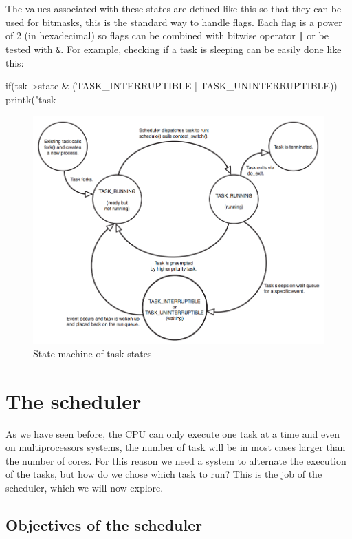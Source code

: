 \documentclass[10pt]{book}
\begin{document}
The values associated with these states are defined like this so that they can be used for bitmasks, this is the standard way to handle flags. Each flag is a power of 2 (in hexadecimal) so flags can be combined with bitwise operator \verb&|& or be tested with \verb|&|. For example, checking if a task is sleeping can be easily done like this: 
\begin{code}
if(tsk->state & (TASK_INTERRUPTIBLE | TASK_UNINTERRUPTIBLE))
    printk("task %
\end{code}

\begin{figure}[ht]
\includegraphics[width=\textwidth]{process_life} %
\caption{State machine of task states}
\label{img:process_life}
\end{figure}

\chapter{The scheduler}
\label{ch:sched}

As we have seen before, the CPU can only execute one task at a time and even on multiprocessors systems, the number of task will be in most cases larger than the number of cores. For this reason we need a system to alternate the execution of the tasks, but how do we chose which task to run? This is the job of the scheduler, which we will now explore.

\section{Objectives of the scheduler}
\end{document}
